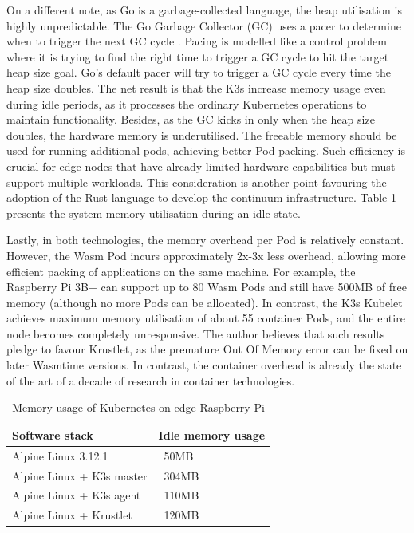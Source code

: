 On a different note, as Go is a garbage-collected language, the heap utilisation is highly unpredictable. The Go Garbage Collector (GC) uses a pacer to determine when to trigger the next GC cycle \cite{go-gc}. Pacing is modelled like a control problem where it is trying to find the right time to trigger a GC cycle to hit the target heap size goal. Go’s default pacer will try to trigger a GC cycle every time the heap size doubles. The net result is that the K3s increase memory usage even during idle periods, as it processes the ordinary Kubernetes operations to maintain functionality. Besides, as the GC kicks in only when the heap size doubles, the hardware memory is underutilised. The freeable memory should be used for running additional pods, achieving better Pod packing. Such efficiency is crucial for edge nodes that have already limited hardware capabilities but must support multiple workloads. This consideration is another point favouring the adoption of the Rust language to develop the continuum infrastructure. Table \ref{tab1} presents the system memory utilisation during an idle state.

Lastly, in both technologies, the memory overhead per Pod is relatively constant. However, the Wasm Pod incurs approximately 2x-3x less overhead, allowing more efficient packing of applications on the same machine. For example, the Raspberry Pi 3B+ can support up to 80 Wasm Pods and still have 500MB of free memory (although no more Pods can be allocated). In contrast, the K3s Kubelet achieves maximum memory utilisation of about 55 container Pods, and the entire node becomes completely unresponsive. The author believes that such results pledge to favour Krustlet, as the premature Out Of Memory error can be fixed on later Wasmtime versions. In contrast, the container overhead is already the state of the art of a decade of research in container technologies.

\begin{table}
\caption{Memory usage of Kubernetes on edge Raspberry Pi}
\begin{tabular}{|l|l|}
\hline
Software stack & Idle memory usage \\
\hline
Alpine Linux 3.12.1 & ~50MB \\
Alpine Linux + K3s master & ~304MB \\
Alpine Linux + K3s agent & ~110MB \\
Alpine Linux + Krustlet & ~120MB \\
\hline
\end{tabular}
\label{tab1}
\end{table}

